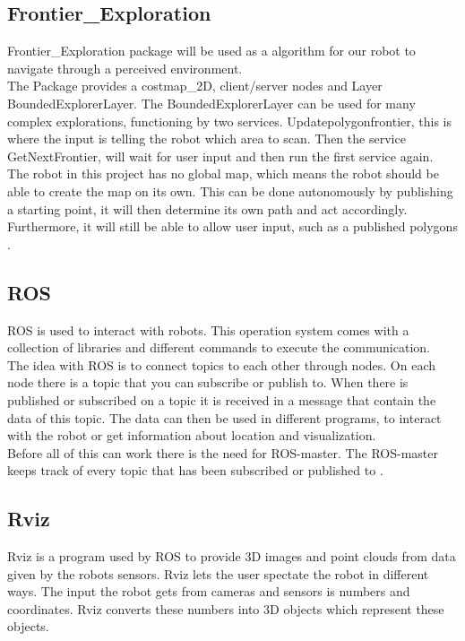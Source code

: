 \subsection{Frontier\_Exploration}
Frontier\_Exploration package will be used as a algorithm for our robot to navigate through a perceived environment.\\
The Package provides a costmap\_2D, client/server nodes and Layer BoundedExplorerLayer. The BoundedExplorerLayer can be used for many complex explorations, functioning by two services. Updatepolygonfrontier, this is where the input is telling the robot which area to scan. Then the service GetNextFrontier, will wait for user input and then run the first service again.\\
The robot in this project has no global map, which means the robot should be able to create the map on its own. This can be done autonomously by publishing a starting point, it will then determine its own path and act accordingly. Furthermore, it will still be able to allow user input, such as a published polygons \cite{ROSexploration}.\\

\subsection{ROS}
ROS is used to interact with robots. This operation system comes with a collection of libraries and different commands to execute the communication.\\
The idea with ROS is to connect topics to each other through nodes. On each node there is a topic that you can subscribe or publish to. When there is published or subscribed on a topic it is received in a message that contain the data of this topic. The data can then be used in different programs, to interact with the robot or get information about location and visualization. \\
Before all of this can work there is the need for ROS-master. The ROS-master keeps track of every topic that has been subscribed or published to \cite{ROSwiki}.\\

\subsection{Rviz}
Rviz is a program used by ROS to provide 3D images and point clouds from data given by the robots sensors. Rviz lets the user spectate the robot in different ways. The input the robot gets from cameras and sensors is numbers and coordinates. Rviz converts these numbers into 3D objects which represent these objects\cite{interactiveMarkers}.\\

